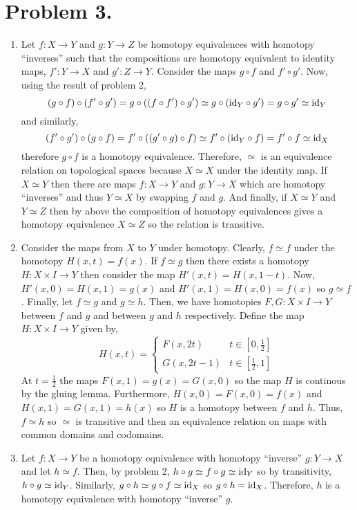\documentclass[12pt]{extarticle}
\begin{document}
\section*{Problem 3.}
\begin{enumerate}
\item Let $f : X \to Y$ and $g : Y \to Z$ be homotopy equivalences with homotopy ``inverses'' such that the compositions are homotopy equivalent to identity maps, $f' : Y \to X$ and $g' : Z \to Y$. Consider the maps $g \circ f$ and $f' \circ g'$. Now, using the result of problem 2,
\[(g \circ f) \circ (f' \circ g') = g \circ ((f \circ f') \circ g') \simeq g \circ (\mathrm{id}_Y \circ g') = g \circ g' \simeq \mathrm{id}_Y\]
and similarly,
\[(f' \circ g') \circ (g \circ f) = f' \circ ((g' \circ g) \circ f) \simeq f' \circ (\mathrm{id}_Y \circ f) = f' \circ f \simeq \mathrm{id}_X\]
therefore $g \circ f$ is a homotopy equivalence. Therefore, $\simeq$ is an equivalence relation on topological spaces because $X \simeq X$ under the identity map. If $X \simeq Y$ then there are maps $f : X \to Y$ and $g : Y \to X$ which are homotopy ``inverses'' and thus $Y \simeq X$ by swapping $f$ and $g$. And finally, if $X \simeq Y$ and $Y \simeq Z$ then by above the composition of homotopy equivalences gives a homotopy equivalence $X \simeq Z$ so the relation is transitive. 

\item Consider the maps from $X$ to $Y$ under homotopy. Clearly, $f \simeq f$ under the homotopy $H(x, t) = f(x)$. If $f \simeq g$ then there exists a homotopy $H : X \times I \to Y$ then consider the map $H'(x, t) = H(x, 1 - t)$. Now, $H'(x, 0) = H(x, 1) = g(x)$ and $H'(x, 1) = H(x, 0) = f(x)$ so $g \simeq f$. Finally, let $f \simeq g$ and $g \simeq h$. Then, we have homotopies $F, G : X \times I \to Y$ between $f$ and $g$ and between $g$ and $h$ respectively. Define the map $H : X \times I \to Y$ given by,
\[ H(x, t) = \begin{cases}
F(x, 2t) & t \in [0, \tfrac{1}{2}] \\
G(x, 2t - 1) & t \in [\tfrac{1}{2}, 1]
\end{cases}\]
At $t = \tfrac{1}{2}$ the maps $F(x, 1) = g(x) = G(x, 0)$ so the map $H$ is continous by the gluing lemma. Furthermore, $H(x, 0) = F(x, 0) = f(x)$ and $H(x, 1) = G(x, 1) = h(x)$ so $H$ is a homotopy between $f$ and $h$. Thus, $f \simeq h$ so $\simeq$ is transitive and then an equivalence relation on maps with common domains and codomains. 
\item Let $f : X \to Y$ be a homotopy equivalence with homotopy ``inverse'' $g : Y \to X$ and let $h \simeq f$. Then, by problem 2, $h \circ g \simeq f \circ g \simeq \mathrm{id}_Y$ so by transitivity, $h \circ g \simeq \mathrm{id}_Y$. Similarly, $g \circ h \simeq g \circ f \simeq \mathrm{id}_X$ so $g \circ h = \mathrm{id}_X$. Therefore, $h$ is a homotopy equivalence with homotopy ``inverse'' $g$. 
\end{enumerate}
\end{document}
